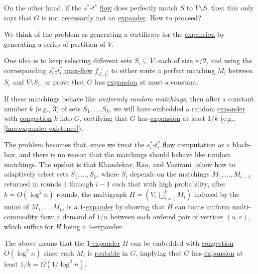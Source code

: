 On the other hand, if the \(s^{\ast} \)-\(t^{\ast} \) \hyperref[def:flow]{flow} does perfectly match \(S\) to \(V\setminus S\), then this only says that \(G\) is not necessarily not an \hyperref[def:expander]{expander}. How to proceed?

\begin{intuition}
	We think of the problem as generating a certificate for the \hyperref[def:expansion]{expansion} by generating a series of partition of \(V\).
\end{intuition}

One idea is to keep selecting different sets \(S_i \subseteq V\), each of size \(n / 2\), and using the corresponding \hyperref[prb:s-t-max-flow]{\(s^{\ast} _i\)-\(t^{\ast} _i\) max-flow} \(f_{s^{\ast}_i , t^{\ast}_i }\) to either route a perfect matching \(M_i\) between \(S_i\) and \(V\setminus S_i\), or prove that \(G\) has \hyperref[def:expansion]{expansion} at most a constant.

\begin{intuition}
	If these matchings behave like \emph{uniformly random matchings}, then after a constant number \(k\) (e.g., \(3\)) of sets \(S_1, \dots , S_k\), we will have embedded a random \hyperref[def:expander]{expander} with \hyperref[def:congestion]{congestion} \(k\) into \(G\), certifying that \(G\) has \hyperref[def:expansion]{expansion} at least \(1 / k\) (e.g., \autoref{lma:expander-existence}).
\end{intuition}

The problem becomes that, since we treat the \hyperref[prb:s-t-max-flow]{\(s^{\ast}_i\)-\(t^{\ast} _i\) flow} computation as a black-box, and there is no reason that the matchings should behave like random matchings. The upshot is that Khandekar, Rao, and Vazirani~\cite{khandekar2009graph} show how to adaptively select sets \(S_1, \dots , S_k\), where \(S_i\) depends on the matchings \(M_1, \dots , M_{i-1}\) returned in rounds \(1\) through \(i-1\) such that with high probability, after \(k = O(\log ^2 n)\) rounds, the multigraph \(H = (V, \bigcup_{i=1}^{k} M_i)\) induced by the union of \(M_1, \dots , M_k\), is a \hyperref[def:expander]{\(1\)-expander} by showing that \(H\) can route uniform multi-commodity flow: a demand of \(1 / n\) between each ordered pair of vertices \((u, v)\), which suffice for \(H\) being a \hyperref[def:expander]{\(1\)-expander}.

\begin{remark}
	The above means that the \hyperref[def:expander]{\(1\)-expander} \(H\) can be embedded with \hyperref[def:congestion]{congestion} \(O(\log ^2 n)\) since each \(M_i\) is \hyperref[def:routable]{routable} in \(G\), implying that \(G\) has \hyperref[def:expansion]{expansion} at least \(1 / k = \Omega (1 / \log ^2 n)\).
\end{remark}

